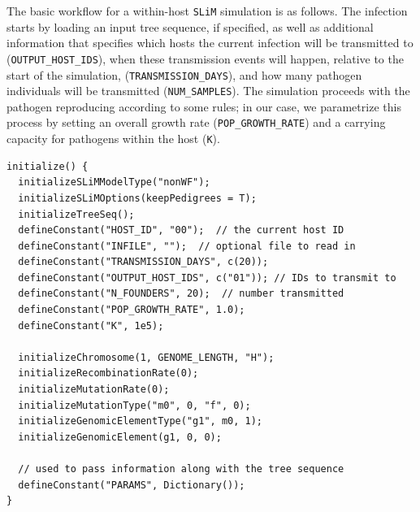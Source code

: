 \documentclass[12pt]{article}
\newcommand{\slim}[0]{\texttt{SLiM}\xspace}
\begin{document}
The basic workflow for a within-host \slim simulation is as follows. The infection starts by loading an input tree sequence, if specified,
as well as additional information that specifies which hosts the current infection will be transmitted to (\verb|OUTPUT_HOST_IDS|),
when these transmission events will happen, relative to the start of the simulation, (\verb|TRANSMISSION_DAYS|),
and how many pathogen individuals will be transmitted (\verb|NUM_SAMPLES|).
The simulation proceeds with the pathogen reproducing according
to some rules; in our case, we parametrize this process by setting an overall growth rate (\verb|POP_GROWTH_RATE|)
and a carrying capacity for pathogens within the host (\verb|K|).

\begin{lstlisting}[language=slim, style=slimstyle, breaklines=true]
initialize() {
  initializeSLiMModelType("nonWF");
  initializeSLiMOptions(keepPedigrees = T);
  initializeTreeSeq();
  defineConstant("HOST_ID", "00");  // the current host ID
  defineConstant("INFILE", "");  // optional file to read in
  defineConstant("TRANSMISSION_DAYS", c(20));
  defineConstant("OUTPUT_HOST_IDS", c("01")); // IDs to transmit to
  defineConstant("N_FOUNDERS", 20);  // number transmitted
  defineConstant("POP_GROWTH_RATE", 1.0);
  defineConstant("K", 1e5);
  
  initializeChromosome(1, GENOME_LENGTH, "H");
  initializeRecombinationRate(0);
  initializeMutationRate(0);
  initializeMutationType("m0", 0, "f", 0);
  initializeGenomicElementType("g1", m0, 1);
  initializeGenomicElement(g1, 0, 0);

  // used to pass information along with the tree sequence
  defineConstant("PARAMS", Dictionary());
}
\end{lstlisting}
\end{document}
